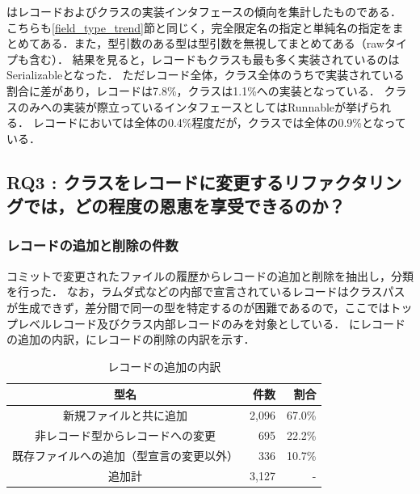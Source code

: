 はレコードおよびクラスの実装インタフェースの傾向を集計したものである．
こちらも\ref{field_type_trend}節と同じく，完全限定名の指定と単純名の指定をまとめてある．また，型引数のある型は型引数を無視してまとめてある（rawタイプも含む）．
結果を見ると，レコードもクラスも最も多く実装されているのはSerializableとなった．
ただレコード全体，クラス全体のうちで実装されている割合に差があり，レコードは7.8\%，クラスは1.1\%への実装となっている．
クラスのみへの実装が際立っているインタフェースとしてはRunnableが挙げられる．
レコードにおいては全体の0.4\%程度だが，クラスでは全体の0.9\%となっている．

\subsection{RQ3 : クラスをレコードに変更するリファクタリングでは，どの程度の恩恵を享受できるのか？\label{rq3_result}}

\subsubsection{レコードの追加と削除の件数}
コミットで変更されたファイルの履歴からレコードの追加と削除を抽出し，分類を行った．
なお，ラムダ式などの内部で宣言されているレコードはクラスパスが生成できず，差分間で同一の型を特定するのが困難であるので，ここではトップレベルレコード及びクラス内部レコードのみを対象としている．
にレコードの追加の内訳，にレコードの削除の内訳を示す．

\begin{table}[t]
    \caption{レコードの追加の内訳}
    \label{record_addition}
    \centering
    \begin{tabular}{c||r|r}
        \hline
        型名 & 件数 & 割合\\
        \hline\hline
        新規ファイルと共に追加 & 2,096 & 67.0\%\\
        非レコード型からレコードへの変更 & 695 & 22.2\%\\
        既存ファイルへの追加（型宣言の変更以外） & 336 & 10.7\%\\
        \hline
        追加計 & 3,127 & -\\
        \hline
    \end{tabular}
\end{table}

